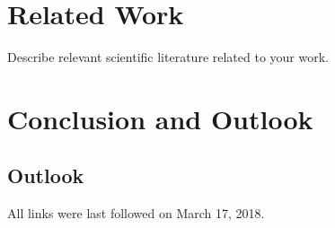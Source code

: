 \documentclass[
  a4paper,  %
  twoside,  %
  bibliography=totoc,
  headsepline,
  cleardoublepage=empty,
  parskip=half,
  draft=false
]{scrbook}
\begin{document}
\blinddocument

\chapter{Related Work}

Describe relevant scientific literature related to your work.

\chapter{Conclusion and Outlook}
\label{chap:zusfas}

\section*{Outlook}

\printbibliography

All links were last followed on March 17, 2018.

\appendix


\pagestyle{empty}
\renewcommand*{\chapterpagestyle}{empty}
\Versicherung
\end{document}
